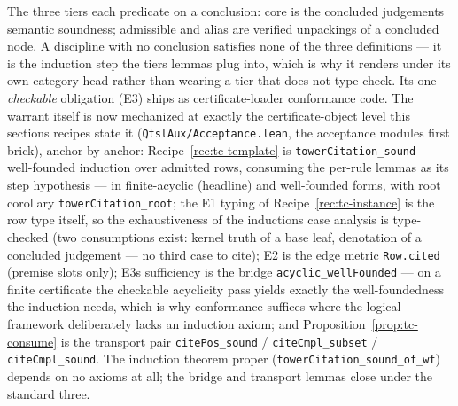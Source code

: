 \begin{bremark}
The three tiers each predicate on a conclusion: core is the concluded
judgement\textquotesingle s semantic soundness; admissible and alias
are verified unpackings of a concluded node. A discipline with no
conclusion satisfies none of the three definitions --- it is the
induction step the tiers\textquotesingle{} lemmas plug into, which is
why it renders under its own category head rather than wearing a tier
that does not type-check. Its one \emph{checkable} obligation (E3)
ships as certificate-loader conformance code. The warrant itself is
now mechanized at exactly the certificate-object level this
section\textquotesingle s recipes state it
(\texttt{QtslAux/Acceptance.lean}, the acceptance
module\textquotesingle s first brick), anchor by anchor:
Recipe~\ref{rec:tc-template} is \texttt{towerCitation\_sound} ---
well-founded induction over admitted rows, consuming the per-rule
lemmas as its step hypothesis --- in finite-acyclic (headline) and
well-founded forms, with root corollary
\texttt{towerCitation\_root}; the E1 typing of
Recipe~\ref{rec:tc-instance} is the row type itself, so the
exhaustiveness of the induction\textquotesingle s case analysis is
type-checked (two consumptions exist: kernel truth of a base leaf,
denotation of a concluded judgement --- no third case to cite); E2 is
the edge metric \texttt{Row.cited} (premise slots only); E3\textquotesingle s
sufficiency is the bridge \texttt{acyclic\_wellFounded} --- on a
finite certificate the checkable acyclicity pass yields exactly the
well-foundedness the induction needs, which is why conformance
suffices where the logical framework deliberately lacks an induction
axiom; and Proposition~\ref{prop:tc-consume} is the transport pair
\texttt{citePos\_sound} / \texttt{citeCmpl\_subset} /
\texttt{citeCmpl\_sound}. The induction theorem proper
(\texttt{towerCitation\_sound\_of\_wf}) depends on no axioms at all;
the bridge and transport lemmas close under the standard three.
\end{bremark}

